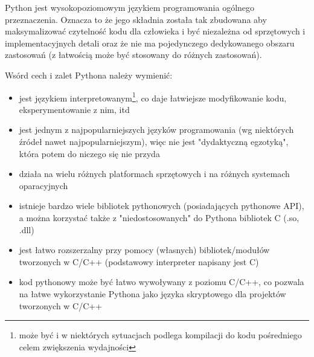 % 
% 
% 
% 

Python jest wysokopoziomowym językiem programowania ogólnego przeznaczenia.
Oznacza to że jego składnia została tak zbudowana aby maksymalizować czytelność kodu dla człowieka i być niezależna od sprzętowych i implementacyjnych detali
	oraz że nie ma pojedynczego dedykowanego obszaru zastosowań (z łatwością może być stosowany do różnych zastosowań).

Wsórd cech i zalet Pythona należy wymienić:
\begin{itemize}
\item jest językiem interpretowanym\footnote{może być i w niektórych sytuacjach podlega kompilacji do kodu pośredniego celem zwiększenia wydajności}, co daje łatwiejsze modyfikowanie kodu, eksperymentowanie z nim, itd
\item jest jednym z najpopularniejszych języków programowania (wg niektórych źródeł nawet najpopularniejszym), więc nie jest "dydaktyczną egzotyką", która potem do niczego się nie przyda
\item działa na wielu różnych platformach sprzętowych i na różnych systemach oparacyjnych
\item istnieje bardzo wiele bibliotek pythonowych (posiadających pythonowe API), a można korzystać także z "niedostosowanych" do Pythona bibliotek C (.so, .dll)
\item jest łatwo rozszerzalny przy pomocy (własnych) bibliotek/modułów tworzonych w C/C++ (podstawowy interpreter napisany jest C)
\item kod pythonowy może być łatwo wywoływany z poziomu C/C++, co pozwala na łatwe wykorzystanie Pythona jako języka skryptowego dla projektów tworzonych w C/C++
\end{itemize}

